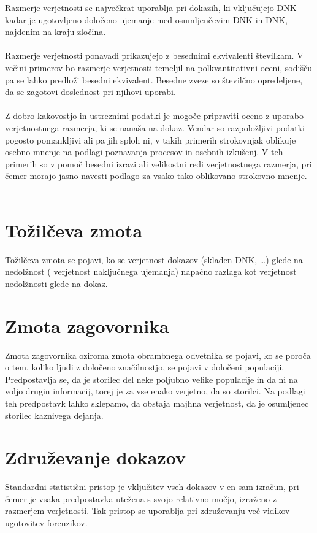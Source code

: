 \documentclass[a4paper,12pt]{article}
\begin{document}
Razmerje verjetnosti se največkrat uporablja pri dokazih, ki vključujejo DNK - kadar je ugotovljeno določeno ujemanje med 
osumljenčevim DNK in DNK, najdenim na kraju zločina. \\ \\

Razmerje verjetnosti ponavadi prikazujejo z besednimi ekvivalenti številkam. V večini 
primerov bo razmerje verjetnosti temeljil na polkvantitativni oceni, sodišču pa se lahko 
predloži besedni ekvivalent. Besedne zveze so številčno opredeljene, da se zagotovi doslednost pri njihovi uporabi. \\ \\

Z dobro kakovostjo in ustreznimi podatki je mogoče pripraviti oceno z uporabo verjetnostnega razmerja, ki se nanaša na dokaz. Vendar 
so razpoložljivi podatki pogosto pomankljivi ali pa jih sploh ni, v takih primerih strokovnjak oblikuje osebno mnenje na podlagi 
poznavanja procesov in osebnih izkušenj. V teh primerih so v pomoč besedni izrazi ali velikostni redi verjetnostnega razmerja, pri 
čemer morajo jasno navesti podlago za vsako tako oblikovano strokovno mnenje. \\ \\

\section{Tožilčeva zmota}
Tožilčeva zmota se pojavi, ko se verjetnost dokazov (skladen DNK, \dots) glede na nedolžnost ( verjetnost naključnega ujemanja) napačno 
razlaga kot verjetnost nedolžnosti glede na dokaz. 

\section{Zmota zagovornika}
Zmota zagovornika oziroma zmota obrambnega odvetnika se pojavi, ko se poroča o tem, koliko ljudi z določeno značilnostjo, se pojavi v 
določeni populaciji. Predpostavlja se, da je storilec del neke poljubno velike populacije in da ni na voljo drugin informacij, torej 
je za vse enako verjetno, da so storilci. Na podlagi teh predpostavk lahko sklepamo, da obstaja majhna verjetnost, da je osumljenec 
storilec kaznivega dejanja. 

\section{Združevanje dokazov}
Standardni statistični pristop je vključitev vseh dokazov v en sam izračun, pri čemer je vsaka predpostavka utežena s svojo relativno 
močjo, izraženo z razmerjem verjetnosti. Tak pristop se uporablja pri združevanju več vidikov ugotovitev forenzikov. 
\end{document}
